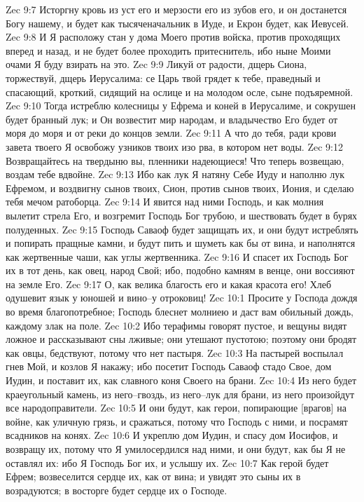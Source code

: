 Zec 9:7  Исторгну кровь из уст его и мерзости его из зубов его, и он достанется Богу нашему, и будет как тысяченачальник в Иуде, и Екрон будет, как Иевусей.
Zec 9:8  И Я расположу стан у дома Моего против войска, против проходящих вперед и назад, и не будет более проходить притеснитель, ибо ныне Моими очами Я буду взирать на это.
Zec 9:9  Ликуй от радости, дщерь Сиона, торжествуй, дщерь Иерусалима: се Царь твой грядет к тебе, праведный и спасающий, кроткий, сидящий на ослице и на молодом осле, сыне подъяремной.
Zec 9:10  Тогда истреблю колесницы у Ефрема и коней в Иерусалиме, и сокрушен будет бранный лук; и Он возвестит мир народам, и владычество Его будет от моря до моря и от реки до концов земли.
Zec 9:11  А что до тебя, ради крови завета твоего Я освобожу узников твоих изо рва, в котором нет воды.
Zec 9:12  Возвращайтесь на твердыню вы, пленники надеющиеся! Что теперь возвещаю, воздам тебе вдвойне.
Zec 9:13  Ибо как лук Я натяну Себе Иуду и наполню лук Ефремом, и воздвигну сынов твоих, Сион, против сынов твоих, Иония, и сделаю тебя мечом ратоборца.
Zec 9:14  И явится над ними Господь, и как молния вылетит стрела Его, и возгремит Господь Бог трубою, и шествовать будет в бурях полуденных.
Zec 9:15  Господь Саваоф будет защищать их, и они будут истреблять и попирать пращные камни, и будут пить и шуметь как бы от вина, и наполнятся как жертвенные чаши, как углы жертвенника.
Zec 9:16  И спасет их Господь Бог их в тот день, как овец, народ Свой; ибо, подобно камням в венце, они воссияют на земле Его.
Zec 9:17  О, как велика благость его и какая красота его! Хлеб одушевит язык у юношей и вино--у отроковиц!
Zec 10:1  Просите у Господа дождя во время благопотребное; Господь блеснет молниею и даст вам обильный дождь, каждому злак на поле.
Zec 10:2  Ибо терафимы говорят пустое, и вещуны видят ложное и рассказывают сны лживые; они утешают пустотою; поэтому они бродят как овцы, бедствуют, потому что нет пастыря.
Zec 10:3  На пастырей воспылал гнев Мой, и козлов Я накажу; ибо посетит Господь Саваоф стадо Свое, дом Иудин, и поставит их, как славного коня Своего на брани.
Zec 10:4  Из него будет краеугольный камень, из него--гвоздь, из него--лук для брани, из него произойдут все народоправители.
Zec 10:5  И они будут, как герои, попирающие [врагов] на войне, как уличную грязь, и сражаться, потому что Господь с ними, и посрамят всадников на конях.
Zec 10:6  И укреплю дом Иудин, и спасу дом Иосифов, и возвращу их, потому что Я умилосердился над ними, и они будут, как бы Я не оставлял их: ибо Я Господь Бог их, и услышу их.
Zec 10:7  Как герой будет Ефрем; возвеселится сердце их, как от вина; и увидят это сыны их в возрадуются; в восторге будет сердце их о Господе.
